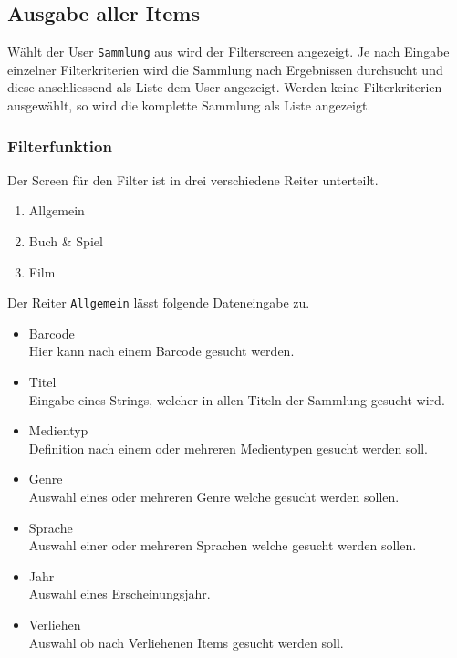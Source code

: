 \subsection{Ausgabe aller Items}

Wählt der User {\color{IndianRed}\texttt{Sammlung}} aus wird der Filterscreen angezeigt. Je nach Eingabe einzelner Filterkriterien wird die Sammlung nach Ergebnissen durchsucht und diese anschliessend als Liste dem User angezeigt. Werden keine Filterkriterien ausgewählt, so wird die komplette Sammlung als Liste angezeigt.

\subsubsection{Filterfunktion}

Der Screen für den Filter ist in drei verschiedene Reiter unterteilt.

\begin{enumerate}
	\item Allgemein
	\item Buch \& Spiel
	\item Film
\end{enumerate}

Der Reiter {\color{IndianRed}\texttt{Allgemein}} lässt folgende Dateneingabe zu.

\begin{itemize}
	\item Barcode \\
		Hier kann nach einem Barcode gesucht werden.
	\item Titel \\
		Eingabe eines Strings, welcher in allen Titeln der Sammlung gesucht wird.
	\item Medientyp \\
		Definition nach einem oder mehreren Medientypen gesucht werden soll.
	\item Genre \\
		Auswahl eines oder mehreren Genre welche gesucht werden sollen.
	\item Sprache \\
		Auswahl einer oder mehreren Sprachen welche gesucht werden sollen.
	\item Jahr \\
		Auswahl eines Erscheinungsjahr.
	\item Verliehen \\
		Auswahl ob nach Verliehenen Items gesucht werden soll.
\end{itemize} 

